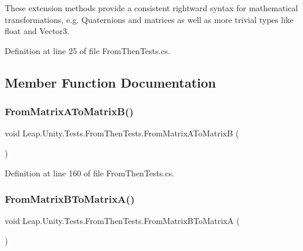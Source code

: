 These extension methods provide a consistent rightward syntax for mathematical transformations, e.\+g. Quaternions and matrices as well as more trivial types like float and Vector3. 

Definition at line 25 of file From\+Then\+Tests.\+cs.



\subsection{Member Function Documentation}
\mbox{\label{class_leap_1_1_unity_1_1_tests_1_1_from_then_tests_ab7340c746f1644dd306c8c2bd0fb8494}} 
\subsubsection{\texorpdfstring{FromMatrixAToMatrixB()}{FromMatrixAToMatrixB()}}
{\footnotesize\ttfamily void Leap.\+Unity.\+Tests.\+From\+Then\+Tests.\+From\+Matrix\+A\+To\+MatrixB (\begin{DoxyParamCaption}{ }\end{DoxyParamCaption})}



Definition at line 160 of file From\+Then\+Tests.\+cs.

\mbox{\label{class_leap_1_1_unity_1_1_tests_1_1_from_then_tests_a1777b74b2ac9383c7dbd57a398731c8b}} 
\subsubsection{\texorpdfstring{FromMatrixBToMatrixA()}{FromMatrixBToMatrixA()}}
{\footnotesize\ttfamily void Leap.\+Unity.\+Tests.\+From\+Then\+Tests.\+From\+Matrix\+B\+To\+MatrixA (\begin{DoxyParamCaption}{ }\end{DoxyParamCaption})}




